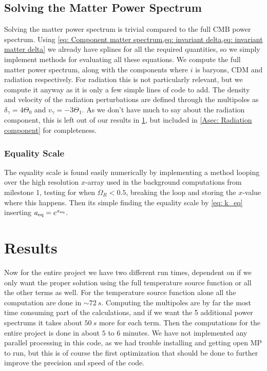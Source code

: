 \documentclass[10pt,a4paper]{article}
\providecommand{\rCDM}
{\ensuremath{
\textrm{CDM}
}
}
\begin{document}
\subsection{Solving the Matter Power Spectrum}
\label{subsec:Method/solving matter power spectrum}
Solving the matter power spectrum is trivial compared to the full CMB power spectrum. Using \cref{eq: Component matter spectrum,eq: invariant delta,eq: invariant matter delta} we already have splines for all the required quantities, so we simply implement methods for evaluating all these equations. We compute the full matter power spectrum, along with the components where $i$ is baryons, \rCDM and radiation respectively. For radiation this is not particularly relevant, but we compute it anyway as it is only a few simple lines of code to add. The density and velocity of the radiation perturbations are defined through the multipoles as $\delta_\gamma = 4\Theta_0$ and $v_\gamma = -3\Theta_1$. As we don't have much to say about the radiation component, this is left out of our results in \cref{sec:Results}, but included in \cref{Asec: Radiation component} for completeness.

\subsubsection{Equality Scale}
\label{subsubsec:Method/Equality Scale}
The equality scale is found easily numerically by implementing a method looping over the high resolution $x$-array used in the background computations from milestone 1, testing for when $\Omega_R<0.5$, breaking the loop and storing the $x$-value where this happens. Then its simple finding the equality scale by \cref{eq: k_eq} inserting $a_{\rm{eq}} = e^{x_{\rm{eq}}}$.



\section{Results}
\label{sec:Results}
Now for the entire project we have two different run times, dependent on if we only want the proper solution using the full temperature source function or all the other terms as well. For the temperature source function alone all the computation are done in $\sim \SI{72}{s}$. Computing the multipoles are by far the most time consuming part of the calculations, and if we want the 5 additional power spectrums it takes about $\SI{50}{s}$ more for each term. Then the computations for the entire project is done in about $5$ to $6$ minutes. We have not implemented any parallel processing in this code, as we had trouble installing and getting open MP to run, but this is of course the first optimization that should be done to further improve the precision and speed of the code.
\end{document}
